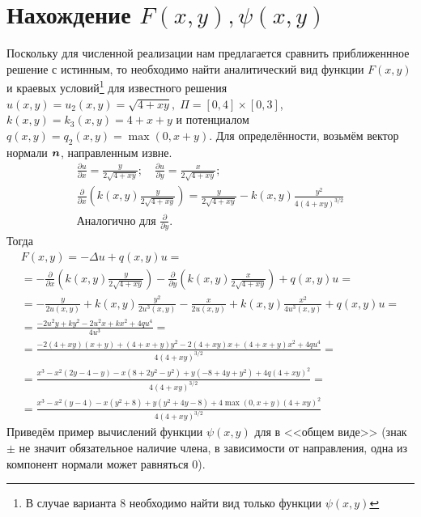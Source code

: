 \documentclass[12pt, fleqn]{article}
\theoremstyle{definition}
\def\vec#1{\mathchoice{\mbox{\boldmath$\displaystyle#1$}}
{\mbox{\boldmath$\textstyle#1$}} {\mbox{\boldmath$\scriptstyle#1$}} {\mbox{\boldmath$\scriptscriptstyle#1$}}}
\begin{document}
\section{Нахождение \texorpdfstring{$F(x, y),\psi(x, y)$}{F(x,y), psi(x,y)}}
Поскольку для численной реализации нам предлагается сравнить приближеннное решение с истинным, то необходимо найти аналитический вид функции $F(x, y)$ и краевых условий\footnote{В случае варианта 8 необходимо найти вид только функции $\psi(x, y)$} для известного решения $u(x,y) = u_2(x, y) = \sqrt{4 + xy}, \;\Pi = [0,4]\times[0, 3]$, $k(x, y) = k_3(x, y) = 4 + x + y$ и потенциалом $q(x, y) = q_2(x, y) = \max(0, x + y)$. Для определённости, возьмём вектор нормали $\vec{n}$, направленным извне.
\abovedisplayskip=1pt
\belowdisplayskip=2pt
\noindent
\begin{gather*}
 \frac{\partial u}{\partial x} = \frac{y}{2\sqrt{4 + xy}}; \quad \frac{\partial u}{\partial y} = \frac{x}{2\sqrt{4 + xy}}; \\
 \frac{\partial}{\partial x}\left(k(x, y)\frac{y}{2\sqrt{4 + xy}}\right) = \frac{y}{2\sqrt{4 + xy}} - k(x, y)\frac{y^2}{4(4 + xy)^{3/2}}\\
 \text{Аналогично для }\frac{\partial}{\partial y}.
\end{gather*}
Тогда
\abovedisplayskip=1pt
\belowdisplayskip=2pt
\noindent
\begin{gather}
 F(x, y) = -\Delta u+q(x, y) u = \nonumber \\
 = -\frac{\partial}{\partial x}\left(k(x, y)\frac{y}{2\sqrt{4 + xy}}\right) - \frac{\partial}{\partial y}\left(k(x, y)\frac{x}{2\sqrt{4 + xy}}\right) + q(x, y)u = \nonumber \\
 = -\frac{y}{2u(x, y)} + k(x, y)\frac{y^2}{2u^3(x, y)} - \frac{x}{2u(x, y)} + k(x, y)\frac{x^2}{4u^3(x, y)}  + q(x, y)u = \nonumber \\
 = \frac{-2u^2 y + ky^2 - 2u^2x + kx^2 + 4qu^4}{4u^3} = \nonumber \\
 = \frac{-2(4 + xy)(x+y) + (4 + x + y)y^2 - 2(4 + xy)x + (4 + x + y)x^2 + 4qu^4}{4(4 + xy)^{3/2}} = \nonumber \\
 = \frac{x^3 - x^2(2y - 4 - y) -x(8 + 2y^2 - y^2) + y(-8 + 4y + y^2) + 4q(4 + xy)^2}{4(4 + xy)^{3/2}} = \nonumber \\
 = \frac{x^3 - x^2(y - 4) - x(y^2 + 8) + y(y^2 + 4y -8) + 4\max(0, x+y)(4 + xy)^2}{4(4 + xy)^{3/2}} \label{eq:F}
\end{gather}
Приведём пример вычислений функции $\psi(x, y)$ для в <<общем виде>> (знак $\pm$ не значит обязательное наличие члена, в зависимости от направления, одна из компонент нормали может равняться 0).
\end{document}
